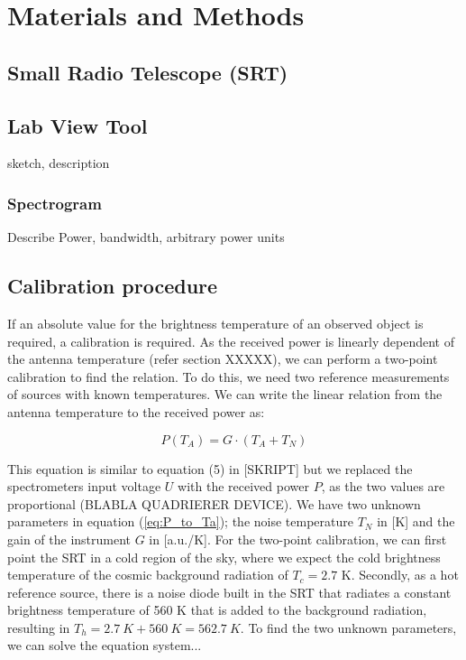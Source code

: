 
\section{Materials and Methods}

\subsection{Small Radio Telescope (SRT)}


\subsection{Lab View Tool}
sketch, description

\subsubsection{Spectrogram}

Describe Power, bandwidth, arbitrary power units


\subsection{Calibration procedure}\label{sec:calib}
If an absolute value for the brightness temperature of an observed object is required, a calibration is required. As the received power is linearly dependent of the antenna temperature (refer section XXXXX), we can perform a two-point calibration to find the relation. To do this, we need two reference measurements of sources with known temperatures. We can write the linear relation from the antenna temperature to the received power as:

\begin{equation} \label{eq:P_to_Ta}
	P(T_A) = G \cdot (T_A + T_N)
\end{equation} 

This equation is similar to equation (5) in [SKRIPT] but we replaced the spectrometers input voltage $U$ with the received power $P$, as the two values are proportional (BLABLA QUADRIERER DEVICE). We have two unknown parameters in equation (\ref{eq:P_to_Ta}); the noise temperature $T_N$ in [K] and the gain of the instrument $G$ in [a.u./K]. For the two-point calibration, we can first point the SRT in a cold region of the sky, where we expect the cold brightness temperature of the cosmic background radiation of $T_c=2.7$ K. Secondly, as a hot reference source, there is a noise diode built in the SRT that radiates a constant brightness temperature of 560 K that is added to the background radiation, resulting in $T_h=\SI{2.7}{K}+\SI{560}{K}=\SI{562.7}{K}$. To find the two unknown parameters, we can solve the equation system...


